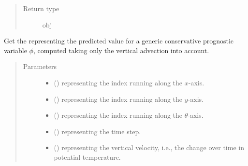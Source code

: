 \documentclass[letterpaper,10pt,english]{sphinxmanual}
\begin{document}
\begin{fulllineitems}
\begin{fulllineitems}
\begin{quote}
\begin{description}
\item[{Return type}] \leavevmode
obj

\end{description}\end{quote}

\end{fulllineitems}


\begin{fulllineitems}
\label{\detokenize{api:dycore.flux_isentropic_maccormack.FluxIsentropicMacCormack._get_maccormack_vertical_predicted_value}}
Get the  representing the predicted value for a generic conservative prognostic
variable \(\phi\), computed taking only the vertical advection into account.
\begin{quote}\begin{description}
\item[{Parameters}] \leavevmode\begin{itemize}
\item {} 
 () \textendash{}  representing the index running along the \(x\)-axis.

\item {} 
 () \textendash{}  representing the index running along the \(y\)-axis.

\item {} 
 () \textendash{}  representing the index running along the \(\theta\)-axis.

\item {} 
 () \textendash{}  representing the time step.

\item {} 
 () \textendash{}  representing the vertical velocity, i.e., the change over time in potential temperature.


\end{itemize}
\end{description}
\end{quote}
\end{fulllineitems}
\end{fulllineitems}
\end{document}
